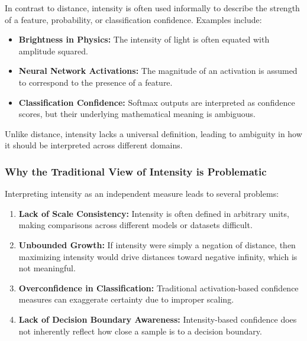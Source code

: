 In contrast to distance, intensity is often used informally to describe the strength of a feature, probability, or classification confidence. Examples include:

\begin{itemize}
    \item \textbf{Brightness in Physics:} The intensity of light is often equated with amplitude squared.
    \item \textbf{Neural Network Activations:} The magnitude of an activation is assumed to correspond to the presence of a feature.
    \item \textbf{Classification Confidence:} Softmax outputs are interpreted as confidence scores, but their underlying mathematical meaning is ambiguous.
\end{itemize}

Unlike distance, intensity lacks a universal definition, leading to ambiguity in how it should be interpreted across different domains.


\subsubsection{Why the Traditional View of Intensity is Problematic}

Interpreting intensity as an independent measure leads to several problems:

\begin{enumerate}
    \item \textbf{Lack of Scale Consistency:} Intensity is often defined in arbitrary units, making comparisons across different models or datasets difficult.
    \item \textbf{Unbounded Growth:} If intensity were simply a negation of distance, then maximizing intensity would drive distances toward negative infinity, which is not meaningful.
    \item \textbf{Overconfidence in Classification:} Traditional activation-based confidence measures can exaggerate certainty due to improper scaling.
    \item \textbf{Lack of Decision Boundary Awareness:} Intensity-based confidence does not inherently reflect how close a sample is to a decision boundary.
\end{enumerate}


